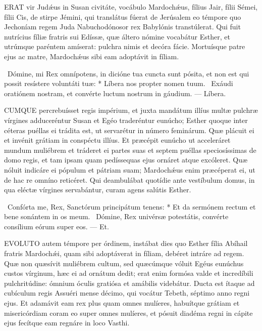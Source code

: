 

\lettrine[lines=2]{E}{RAT} vir Judǽus in Susan civitáte, vocábulo Mardochǽus, fílius Jair, fílii Sémei, fílii Cis, de stirpe Jémini, qui translátus fúerat de Jerúsalem eo témpore quo Jechoníam regem Juda Nabuchodónosor rex Babylónis transtúlerat. Qui fuit nutrícius fíliæ fratris sui Edíssæ, quæ áltero nómine vocabátur Esther, et utrúmque paréntem amíserat: pulchra nimis et decóra fácie. Mortuísque patre ejus ac matre, Mardochǽus sibi eam adoptávit in fíliam.

\R\ Dómine, mi Rex omnípotens, in dicióne tua cuncta sunt pósita, et non est qui possit resístere voluntáti tuæ: * Líbera nos propter nomen tuum. \V\ Exáudi oratiónem nostram, et convérte luctum nostrum in gáudium. — Líbera.


\lettrine[lines=2]{C}{UMQUE} percrebuísset regis impérium, et juxta mandátum illíus multæ pulchræ vírgines adduceréntur Susan et Egéo traderéntur eunúcho; Esther quoque inter céteras puéllas ei trádita est, ut servarétur in número feminárum. Quæ plácuit ei et invénit grátiam in conspéctu illíus. Et præcépit eunúcho ut acceleráret mundum muliébrem et tráderet ei partes suas et septem puéllas speciosíssimas de domo regis, et tam ipsam quam pedíssequas ejus ornáret atque excóleret. Quæ nóluit indicáre ei pópulum et pátriam suam; Mardochǽus enim præcéperat ei, ut de hac re omníno reticéret. Qui deambulábat quotídie ante vestíbulum domus, in qua eléctæ vírgines servabántur, curam agens salútis Esther.

\R\ Confórta me, Rex, Sanctórum principátum tenens: * Et da sermónem rectum et bene sonántem in os meum. \V\ Dómine, Rex univérsæ potestátis, convérte consílium eórum super eos. — Et.



\lettrine[lines=2]{E}{VOLUTO} autem témpore per órdinem, instábat dies quo Esther fília Abíhail fratris Mardochǽi, quam sibi adoptáverat in fíliam, debéret intráre ad regem. Quæ non quæsívit muliébrem cultum, sed quæcúmque vóluit Egéus eunúchus custos vírginum, hæc ei ad ornátum dedit; erat enim formósa valde et incredíbili pulchritúdine: ómnium óculis gratiósa et amábilis videbátur. Ducta est ítaque ad cubículum regis Assuéri mense décimo, qui vocátur Tebeth, séptimo anno regni ejus. Et adamávit eam rex plus quam omnes mulíeres, habuítque grátiam et misericórdiam coram eo super omnes mulíeres, et pósuit diadéma regni in cápite ejus fecítque eam regnáre in loco Vasthi.

